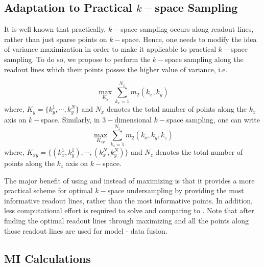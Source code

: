 \documentclass{article}         %
\theoremstyle{definition}
\theoremstyle{remark}
\begin{document}


\subsection{Adaptation to Practical $k-$space Sampling}\label{susec:var_kspace}
It is well known that practically, $k-$space sampling occurs along readout lines, rather than just sparse points on $k-$space. Hence, one needs to modify the idea of variance maximization in order to make it applicable to practical $k-$space sampling. To do so, we propose to perform the $k-$space sampling along the readout lines which their points posses the higher value of variance, i.e.

\begin{equation}\label{var2d}
\max_{K_y} \sum_{k_x=1}^{N_x} m_2(k_x,k_y)
\end{equation}
where, $K_y=\{k_y^1,\cdots,k_y^N\}$ and $N_x$ denotes the total number of points along the $k_x$ axis on $k-$space. Similarly, in $3-$dimensional $k-$space sampling, one can write
\begin{equation}\label{var3d}
\max_{K_{xy}} \sum_{k_z=1}^{N_z} m_2(k_x,k_y,k_z)
\end{equation}
where, $K_{xy}=\{(k_x^1,k_y^1),\cdots,(k_x^N,k_y^N)\}$ and $N_z$ denotes the total number of points along the $k_z$ axis on $k-$space. 

The major benefit of using  and  instead of maximizing  is that it provides a more practical scheme for optimal $k-$space undersampling by providing the most informative readout lines, rather than the most informative points. In addition, less computational effort is required to solve   and  comparing to . Note that after finding the optimal readout lines through maximizing  and  all the points along those readout lines are used for model - data fusion.



\subsection{MI Calculations}
\end{document}
